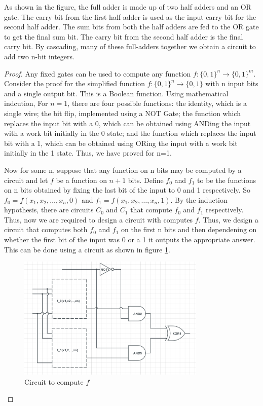 \documentclass[12pt, oneside]{book}
\theoremstyle{definition}
\theoremstyle{definition}
\theoremstyle{remark}
\begin{document}
As shown in the figure, the full adder is made up of two half adders and an OR gate. The carry bit from the first half adder is used as the input carry bit for the second half adder. The sum bits from both the half adders are fed to the OR gate to get the final sum bit. The carry bit from the second half adder is the final carry bit.
By cascading, many of these full-adders together we obtain a circuit to add two n-bit integers.

\label{proof:classicalcomputations}
\begin{proof}
    Any fixed gates can be used to compute any function $f:\{0,1\}^n \rightarrow \{0,1\}^m$.
    Consider the proof for the simplified function $f:\{0,1\}^n \rightarrow \{0,1\}$ with n input bits
    and a single output bit. This is a Boolean function. Using mathematical indcution, For $n=1$, there are four possible functions: the identity, which is 
    a single wire; the bit flip, implemented using a NOT Gate; the function which replaces the input bit with a 0, which can be obtained using ANDing the input 
    with a work bit initially in the 0 state; and the function which replaces the input bit with a 1, which can be obtained using ORing the input with a work bit initially in the 1 state.
    Thus, we have proved for n=1.
    
    Now for some n, suppose that any function on n bits may be computed by a circuit and let $f$ be a function on $n+1$ bits. 
    Define $f_0$ and $f_1$ to be the functions on n bits obtained by fixing the last bit of the input to 0 and 1 respectively.
    So $f_0=f(x_1,x_2,\ldots,x_n,0)$ and $f_1=f(x_1,x_2,\ldots,x_n,1)$.
    By the induction hypothesis, there are circuits $C_0$ and $C_1$ that compute $f_0$ and $f_1$ respectively.
    Thus, now we are required to design a circuit with computes $f$. Thus, we design a circuit that computes both $f_0$ and $f_1$ 
    on the first n bits and then dependening on whether the first bit of the input was 0 or a 1 it outputs the appropriate answer.
    This can be done using a circuit as shown in figure \ref{fig:compute}.
    \begin{figure}[H]
        \centering
        \includegraphics[width=0.8\textwidth]{../images/compute.png}
        \caption{Circuit to compute $f$}
        \label{fig:compute}
    \end{figure}
\end{proof}
\end{document}
